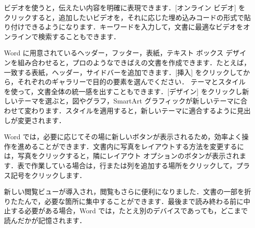 ビデオを使うと，伝えたい内容を明確に表現できます．[オンライン ビデオ] をクリックすると，追加したいビデオを，それに応じた埋め込みコードの形式で貼り付けできるようになります．キーワードを入力して，文書に最適なビデオをオンラインで検索することもできます．

Word に用意されているヘッダー，フッター，表紙，テキスト ボックス デザインを組み合わせると，プロのようなできばえの文書を作成できます．たとえば，一致する表紙，ヘッダー，サイドバーを追加できます．[挿入] をクリックしてから，それぞれのギャラリーで目的の要素を選んでください．
テーマとスタイルを使って，文書全体の統一感を出すこともできます．[デザイン] をクリックし新しいテーマを選ぶと，図やグラフ，SmartArt グラフィックが新しいテーマに合わせて変わります．スタイルを適用すると，新しいテーマに適合するように見出しが変更されます．

Word では，必要に応じてその場に新しいボタンが表示されるため，効率よく操作を進めることができます．文書内に写真をレイアウトする方法を変更するには，写真をクリックすると，隣にレイアウト オプションのボタンが表示されます．表で作業している場合は，行または列を追加する場所をクリックして，プラス記号をクリックします．

新しい閲覧ビューが導入され，閲覧もさらに便利になりました．文書の一部を折りたたんで，必要な箇所に集中することができます．最後まで読み終わる前に中止する必要がある場合，Word では，たとえ別のデバイスであっても，どこまで読んだかが記憶されます．
